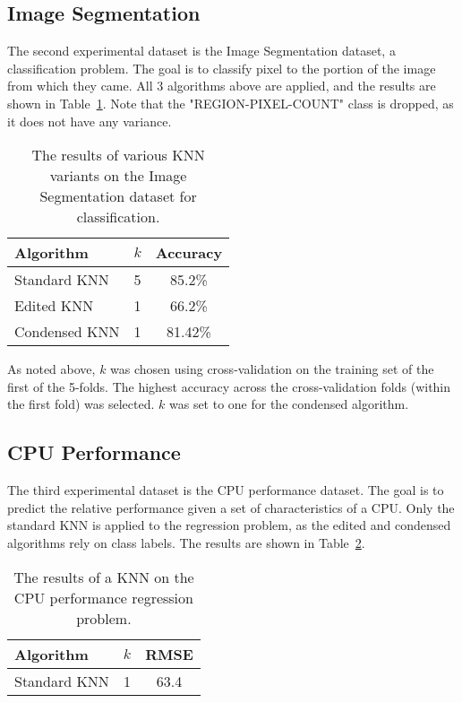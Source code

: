 \documentclass{amsart}
\begin{document}
    \subsection*{Image Segmentation}
    The second experimental dataset is the Image Segmentation dataset, a classification problem. The goal is to
    classify pixel to the portion of the image from which they came. All 3 algorithms above are applied,
    and the results are shown in Table~\ref{image_segmentation_results}. Note that the "REGION-PIXEL-COUNT"
    class is dropped, as it does not have any variance.
    \begin{table}[H]
    \begin{tabular}{lcc}
        Algorithm     & $k$ & Accuracy \\
        \hline
        Standard KNN  & 5 & 85.2\% \\
        Edited KNN    & 1 & 66.2\% \\
        Condensed KNN & 1 & 81.42\% \\
    \end{tabular}
    \label{image_segmentation_results}
    \caption{The results of various KNN variants on the Image Segmentation dataset for classification.}
    \end{table}
    As noted above, $k$ was chosen using cross-validation on the training set of the first of the 5-folds. The highest
    accuracy across the cross-validation folds (within the first fold) was selected. $k$ was set to one for the
    condensed algorithm.

    \subsection*{CPU Performance}
    The third experimental dataset is the CPU performance dataset. The goal is to predict the relative performance
    given a set of characteristics of a CPU. Only the standard KNN is applied to the regression problem, as the edited
    and condensed algorithms rely on class labels. The results are shown in Table~\ref{cpu_performance_results}.
    \begin{table}[H]
    \begin{tabular}{lcc}
        Algorithm     & $k$ & RMSE \\
        \hline
        Standard KNN  & 1 & 63.4
    \end{tabular}
    \label{cpu_performance_results}
    \caption{The results of a KNN on the CPU performance regression problem.}
    \end{table}
\end{document}
